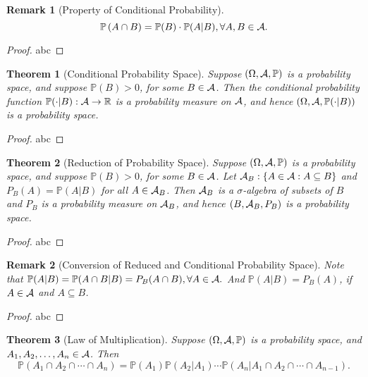 \documentclass[openany,12pt]{book}
\newtheorem{theorem}{Theorem}[chapter]
\newtheorem{remark}{Remark}[chapter]
\begin{document}
\begin{remark}[Property of Conditional Probability]
$$\mathbb{P}\left(A\cap B\right)=\mathbb{P}(B)\cdot \mathbb{P}(A|B),\forall A,B\in\mathcal{A}.$$ 
\end{remark}

\begin{proof}
  abc
\end{proof}

\begin{theorem}[Conditional Probability Space]
Suppose $(\Omega,\mathcal{A},\mathbb{P})$ is a probability space, and suppose $\mathbb{P}(B)>0$, for some $B\in\mathcal{A}$. 
Then the conditional probability function $\mathbb{P}(\cdot|B): \mathcal{A}\to\mathbb{R}$ is a probability measure on $\mathcal{A}$, and hence $(\Omega,\mathcal{A}, \mathbb{P}(\cdot|B))$ is a probability space.
\end{theorem}

\begin{proof}
  abc
\end{proof}

\begin{theorem}[Reduction of Probability Space]
Suppose $(\Omega,\mathcal{A},\mathbb{P})$ is a probability space, and suppose $\mathbb{P}(B)>0$, for some $B\in\mathcal{A}$. Let $\mathcal{A}_B:\{A\in\mathcal{A}: A\subseteq B\}$ and $P_B (A)=\mathbb{P}(A|B)$  for all $A\in\mathcal{A}_B$.  Then $\mathcal{A}_B$ is a $\sigma$-algebra of subsets of $B$ and $P_B$ is a probability measure on $\mathcal{A}_B$, and hence $(B,\mathcal{A}_B,P_B )$ is a probability space.
\end{theorem}

\begin{proof}
  abc
\end{proof}

\begin{remark}[Conversion of Reduced and Conditional Probability Space]
Note that $\mathbb{P}(A|B)=\mathbb{P}(A\cap B|B)=P_B (A\cap B),\forall A\in\mathcal{A}.$ 
And $\mathbb{P}(A|B)=P_B (A)$, if $A\in\mathcal{A}$ and $A\subseteq B$.
\end{remark}

\begin{proof}
  abc
\end{proof}

\begin{theorem}[Law of Multiplication]
  Suppose $(\Omega,\mathcal{A},\mathbb{P})$ is a probability space, and $A_1,A_2,\dots,A_n\in\mathcal{A}$. Then $$\mathbb{P}\left(A_1\cap A_2\cap\cdots\cap A_n\right)=\mathbb{P}(A_1 )\mathbb{P}(A_2|A_1 )\cdots \mathbb{P}\left(A_n|A_1 \cap A_2\cap\cdots\cap A_{n-1}\right).$$
\end{theorem}
\end{document}
